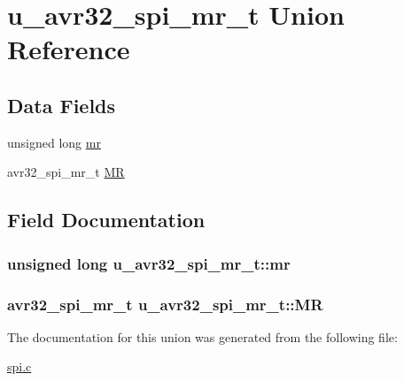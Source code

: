 \hypertarget{unionu__avr32__spi__mr__t}{
\section{u\-\_\-avr32\-\_\-spi\-\_\-mr\-\_\-t \-Union \-Reference}
\label{unionu__avr32__spi__mr__t}
}
\subsection*{\-Data \-Fields}
\begin{DoxyCompactItemize}
\item 
unsigned long \hyperlink{unionu__avr32__spi__mr__t_a41d02dda543e9815d378a405aa5410ec}{mr}
\item 
avr32\-\_\-spi\-\_\-mr\-\_\-t \hyperlink{unionu__avr32__spi__mr__t_ad47c020f6ca59919bf2571ec941db436}{\-M\-R}
\end{DoxyCompactItemize}


\subsection{\-Field \-Documentation}
\hypertarget{unionu__avr32__spi__mr__t_a41d02dda543e9815d378a405aa5410ec}{
\subsubsection[{mr}]{\setlength{\rightskip}{0pt plus 5cm}unsigned long {\bf u\-\_\-avr32\-\_\-spi\-\_\-mr\-\_\-t\-::mr}}}
\label{unionu__avr32__spi__mr__t_a41d02dda543e9815d378a405aa5410ec}
\hypertarget{unionu__avr32__spi__mr__t_ad47c020f6ca59919bf2571ec941db436}{
\subsubsection[{\-M\-R}]{\setlength{\rightskip}{0pt plus 5cm}avr32\-\_\-spi\-\_\-mr\-\_\-t {\bf u\-\_\-avr32\-\_\-spi\-\_\-mr\-\_\-t\-::\-M\-R}}}
\label{unionu__avr32__spi__mr__t_ad47c020f6ca59919bf2571ec941db436}


\-The documentation for this union was generated from the following file\-:\begin{DoxyCompactItemize}
\item 
\hyperlink{spi_8c}{spi.\-c}\end{DoxyCompactItemize}

